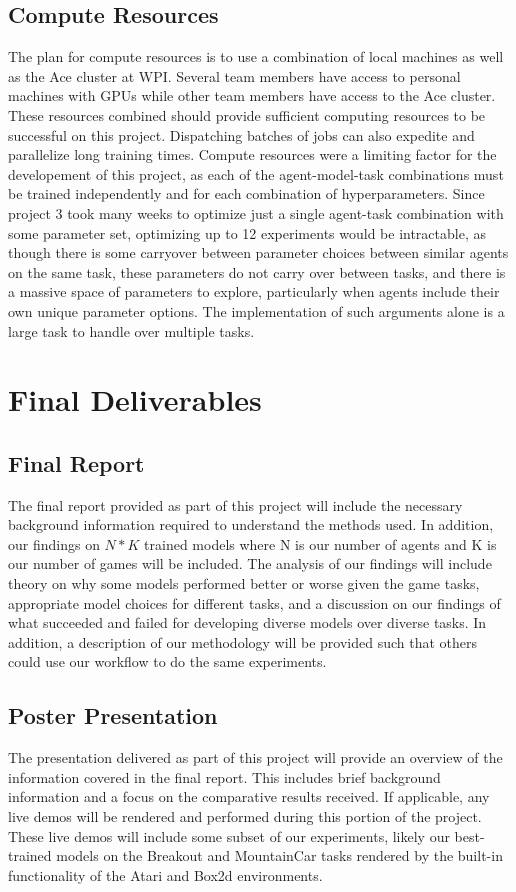 \documentclass[conference]{IEEEtran}
\begin{document}
\subsection{Compute Resources}
The plan for compute resources is to use a combination of local machines as well as the Ace cluster at WPI.
Several team members have access to personal machines with GPUs while other team members have access to the Ace cluster.
These resources combined should provide sufficient computing resources to be successful on this project.
Dispatching batches of jobs can also expedite and parallelize long training times. Compute resources were a limiting factor for the developement of this project, as each of the agent-model-task combinations must be trained independently and for each combination of hyperparameters. Since project 3 took many weeks to optimize just a single agent-task combination with some parameter set, optimizing up to 12 experiments would be intractable, as though there is some carryover between parameter choices between similar agents on the same task, these parameters do not carry over between tasks, and there is a massive space of parameters to explore, particularly when agents include their own unique parameter options. The implementation of such arguments alone is a large task to handle over multiple tasks.

\section{Final Deliverables} \label{deliverables}

\subsection{Final Report}
The final report provided as part of this project will include the necessary background information required to understand the methods used.
In addition, our findings on $N*K$ trained models where N is our number of agents and K is our number of games will be included.
The analysis of our findings will include theory on why some models performed better or worse given the game tasks, appropriate model choices for different tasks, and a discussion on our findings of what succeeded and failed for developing diverse models over diverse tasks.
In addition, a description of our methodology will be provided such that others could use our workflow to do the same experiments.

\subsection{Poster Presentation}
The presentation delivered as part of this project will provide an overview of the information covered in the final report.
This includes brief background information and a focus on the comparative results received.
If applicable, any live demos will be rendered and performed during this portion of the project. These live demos will include some subset of our experiments, likely our best-trained models on the Breakout and MountainCar tasks rendered by the built-in functionality of the Atari and Box2d environments.
\end{document}

